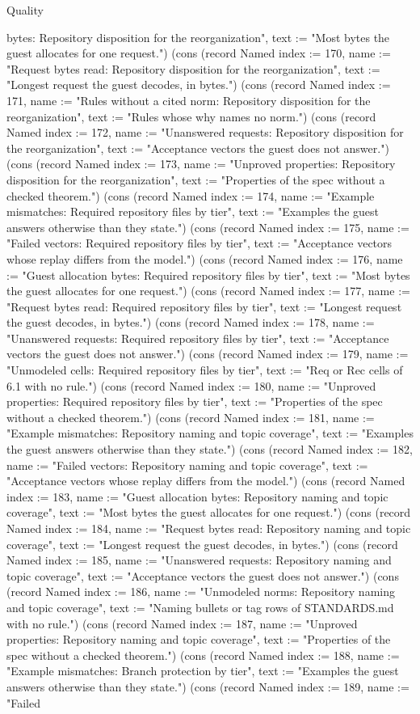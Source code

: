 \begin{lexlean}{Quality}
\begin{semanticmodule}
{bytes: Repository disposition for the reorganization", text := "Most bytes the guest allocates for one request."}) (cons (record Named {index := 170, name := "Request bytes read: Repository disposition for the reorganization", text := "Longest request the guest decodes, in bytes."}) (cons (record Named {index := 171, name := "Rules without a cited norm: Repository disposition for the reorganization", text := "Rules whose why names no norm."}) (cons (record Named {index := 172, name := "Unanswered requests: Repository disposition for the reorganization", text := "Acceptance vectors the guest does not answer."}) (cons (record Named {index := 173, name := "Unproved properties: Repository disposition for the reorganization", text := "Properties of the spec without a checked theorem."}) (cons (record Named {index := 174, name := "Example mismatches: Required repository files by tier", text := "Examples the guest answers otherwise than they state."}) (cons (record Named {index := 175, name := "Failed vectors: Required repository files by tier", text := "Acceptance vectors whose replay differs from the model."}) (cons (record Named {index := 176, name := "Guest allocation bytes: Required repository files by tier", text := "Most bytes the guest allocates for one request."}) (cons (record Named {index := 177, name := "Request bytes read: Required repository files by tier", text := "Longest request the guest decodes, in bytes."}) (cons (record Named {index := 178, name := "Unanswered requests: Required repository files by tier", text := "Acceptance vectors the guest does not answer."}) (cons (record Named {index := 179, name := "Unmodeled cells: Required repository files by tier", text := "Req or Rec cells of 6.1 with no rule."}) (cons (record Named {index := 180, name := "Unproved properties: Required repository files by tier", text := "Properties of the spec without a checked theorem."}) (cons (record Named {index := 181, name := "Example mismatches: Repository naming and topic coverage", text := "Examples the guest answers otherwise than they state."}) (cons (record Named {index := 182, name := "Failed vectors: Repository naming and topic coverage", text := "Acceptance vectors whose replay differs from the model."}) (cons (record Named {index := 183, name := "Guest allocation bytes: Repository naming and topic coverage", text := "Most bytes the guest allocates for one request."}) (cons (record Named {index := 184, name := "Request bytes read: Repository naming and topic coverage", text := "Longest request the guest decodes, in bytes."}) (cons (record Named {index := 185, name := "Unanswered requests: Repository naming and topic coverage", text := "Acceptance vectors the guest does not answer."}) (cons (record Named {index := 186, name := "Unmodeled norms: Repository naming and topic coverage", text := "Naming bullets or tag rows of STANDARDS.md with no rule."}) (cons (record Named {index := 187, name := "Unproved properties: Repository naming and topic coverage", text := "Properties of the spec without a checked theorem."}) (cons (record Named {index := 188, name := "Example mismatches: Branch protection by tier", text := "Examples the guest answers otherwise than they state."}) (cons (record Named {index := 189, name := "Failed }
\end{semanticmodule}
\end{lexlean}

